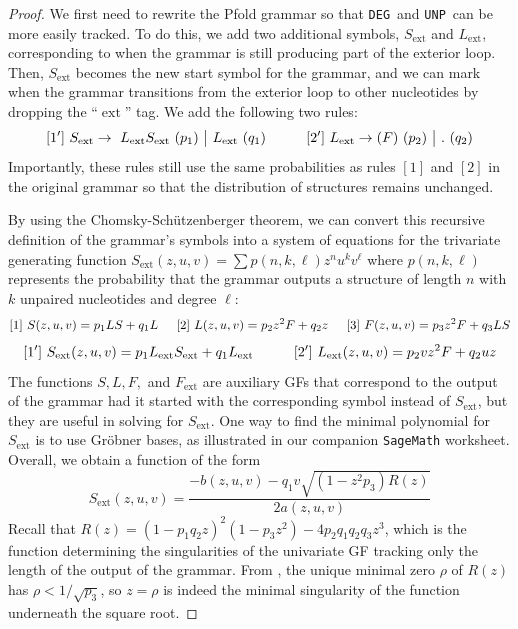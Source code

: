 \documentclass{article}
\DeclareMathOperator{\ex}{ext}
\newcommand{\DEG}{{\tt DEG}}
\newcommand{\UNP}{{\tt UNP}}
\begin{document}
\begin{proof}

We first need to rewrite the Pfold grammar so that \DEG\ and \UNP\ can be more easily tracked.  To do this, we add two additional symbols, $S_{\ex}$ and $L_{\ex}$, corresponding to when the grammar is still producing part of the exterior loop.  Then, $S_{\ex}$ becomes the new start symbol for the grammar, and we can mark when the grammar transitions from the exterior loop to other nucleotides by dropping the ``$\ex$'' tag.  We add the following two rules:
\[
[1']\ S_{\ex} \to\ L_{\ex}S_{\ex} \ (p_1)\ \big|\ L_{\ex} \ (q_1) \hspace{0.4 in} [2']\ L_{\ex} \to (F) \ (p_2) \ \big|\ .\ (q_2)
\]
Importantly, these rules still use the same probabilities as rules $[1]$ and $[2]$ in the original grammar so that the distribution of structures remains unchanged.

By using the Chomsky-Sch\"{u}tzenberger theorem, we can convert this recursive definition of the grammar's symbols into a system of equations for the trivariate generating function $S_{\ex}(z, u, v) = \sum p(n, k, \ell) z^n u^k v^\ell$ where $p(n, k, \ell)$ represents the probability that the grammar outputs a structure of length $n$ with $k$ unpaired nucleotides and degree $\ell$:
\[
[1] \ S(z, u, v) = p_1 LS + q_1L \hspace{.2 in} [2]\ L(z, u, v) = p_2z^2F + q_2z \hspace{.2 in} [3]\ F(z, u, v) = p_3z^2F + q_3LS
\]
\[
[1']\ S_{\ex}(z, u, v) = p_1 L_{\ex}S_{\ex} + q_1L_{\ex} \hspace{.4 in} [2']\ L_{\ex}(z, u, v) = p_2vz^2F + q_2uz
\]
The functions $S, L, F,$ and $F_{\ex}$ are auxiliary GFs that correspond to the output of the grammar had it started with the corresponding symbol instead of $S_{\ex}$, but they are useful in solving for $S_{\ex}$.  One way to find the minimal polynomial for $S_{\ex}$ is to use Gr\"{o}bner bases, as illustrated in our companion {\tt SageMath} worksheet.  Overall, we obtain a function of the form
\begin{equation}
S_{\ex}(z, u, v) = \frac{-b(z, u, v) - q_1v\sqrt{(1-z^2p_3)R(z)}}{2a(z, u, v)} \label{eq:Sext}
\end{equation}
Recall that $R(z) = (1 - p_1q_2z)^2(1-p_3z^2) - 4p_2q_1q_2q_3z^3$, which is the function determining the singularities of the univariate GF tracking only the length of the output of the grammar. From \cite[Lemma 3.3]{Poznanovic:2014}, the unique minimal zero $\rho$ of $R(z)$ has $\rho < 1/\sqrt{p_3}$, so $z = \rho$ is indeed the minimal singularity of the function underneath the square root.


\end{proof}
\end{document}
